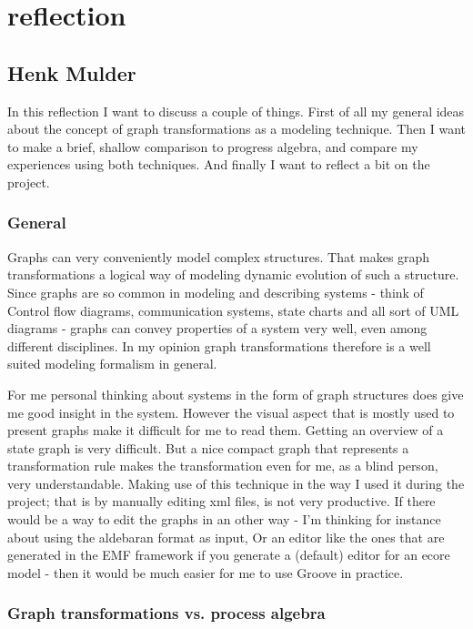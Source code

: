 \section{reflection}
\label{Reflection}

\subsection{Henk Mulder}

In this reflection I want to discuss a couple of things.
First of all my general ideas about the concept of graph transformations as a modeling technique.
Then I want to make a brief, shallow comparison to progress algebra, and compare my experiences using both techniques.
And finally I want to reflect a bit on the project.

\subsubsection{General}
Graphs can very conveniently model complex structures. That makes graph transformations a logical way of modeling dynamic evolution of such a structure.
Since graphs are so common in modeling and describing systems - think of Control flow diagrams, communication systems, state charts and all sort of UML diagrams - graphs can convey properties of a system very well, even among different disciplines.
In my opinion graph transformations therefore is a well suited modeling formalism in general.

For me personal thinking about systems in the form of graph structures does give me good insight in the system. However the visual aspect that is mostly used to present graphs make it difficult for me to read them.
Getting an overview of a state graph is very difficult. But a nice compact graph that represents a transformation rule makes the transformation even for me, as a blind person, very understandable.
Making use of this technique in the way I used it during the project; that is by manually editing xml files, is not very productive. 
If there would be a way to edit the graphs in an other way - I'm thinking for instance about using the aldebaran format as input, Or an editor like the ones that are generated in the EMF framework if you generate a (default) editor for an ecore model - then it would be much easier for me to use Groove in practice.

\subsubsection{Graph transformations vs. process algebra}

